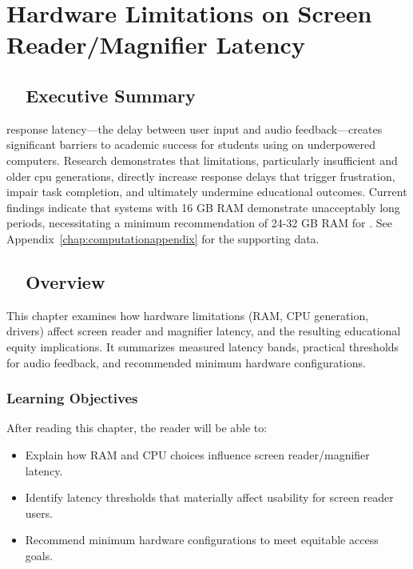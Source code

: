 \chapter{Hardware Limitations on Screen Reader/Magnifier Latency}\label{vision-assistive-technology-laptop-computer-requirements}
\raggedright
\section{~~Executive Summary}\label{executive-summary}

 response latency—the delay between user input and audio feedback—creates significant barriers to academic success for students using  on underpowered computers.\supercite{Foley2017AssistiveTechnologyOutcomes} Research demonstrates that  limitations, particularly insufficient  and older \gls{cpu} generations, directly increase response delays that trigger frustration, impair task completion, and ultimately undermine educational outcomes.\supercite{Kelly2011, StudentOutcomesResearch} Current findings indicate that systems with 16 GB RAM demonstrate unacceptably long  periods, necessitating a minimum recommendation of 24-32 GB RAM for . See Appendix~\ref{chap:computationappendix} for the supporting data.

\section{~~Overview}\label{chap1:overview}
This chapter examines how hardware limitations (RAM, CPU generation, drivers) affect screen reader and magnifier latency, and the resulting educational equity implications. It summarizes measured latency bands, practical thresholds for audio feedback, and recommended minimum hardware configurations.

\subsection{Learning Objectives}\label{chap1:learning-objectives}
After reading this chapter, the reader will be able to:
\begin{itemize}
\item Explain how RAM and CPU choices influence screen reader/magnifier latency.
\item Identify latency thresholds that materially affect usability for screen reader users.
\item Recommend minimum hardware configurations to meet equitable access goals.
\end{itemize}

